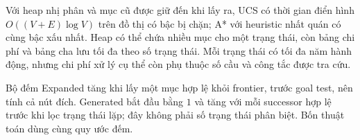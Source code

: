 Với heap nhị phân và mục cũ được giữ đến khi lấy ra, UCS có thời gian điển hình $O((V+E)\log V)$ trên đồ thị có bậc bị chặn; A* với heuristic nhất quán có cùng bậc xấu nhất. Heap có thể chứa nhiều mục cho một trạng thái, còn bảng chi phí và bảng cha lưu tối đa theo số trạng thái. Mỗi trạng thái có tối đa năm hành động, nhưng chi phí xử lý cụ thể còn phụ thuộc số cầu và công tắc được tra cứu.

Bộ đếm Expanded tăng khi lấy một mục hợp lệ khỏi frontier, trước goal test, nên tính cả nút đích. Generated bắt đầu bằng $1$ và tăng với mỗi successor hợp lệ trước khi lọc trạng thái lặp; đây không phải số trạng thái phân biệt. Bốn thuật toán dùng cùng quy ước đếm.
